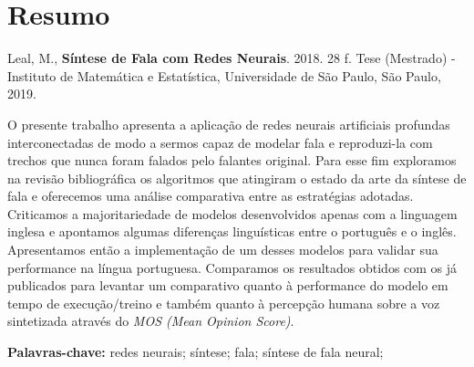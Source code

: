 \documentclass[11pt,twoside,a4paper]{book}
\begin{document}





\chapter*{Resumo}

\noindent Leal, M., \textbf{Síntese de Fala com Redes Neurais}. 2018. 28 f.
Tese (Mestrado) - Instituto de Matemática e Estatística,
Universidade de São Paulo, São Paulo, 2019.

\hfill

O presente trabalho apresenta a aplicação de redes neurais artificiais profundas interconectadas de modo a sermos capaz de modelar fala e reproduzi-la com trechos que nunca foram falados pelo falantes original. Para esse fim exploramos na revisão bibliográfica os algoritmos que atingiram o estado da arte da síntese de fala e oferecemos uma análise comparativa entre as estratégias adotadas. Criticamos a majoritariedade de modelos desenvolvidos apenas com a linguagem inglesa e apontamos algumas diferenças linguísticas entre o português e o inglês. Apresentamos então a implementação de um desses modelos para validar sua performance na língua portuguesa. Comparamos os resultados obtidos com os já publicados para levantar um comparativo quanto à performance do modelo em tempo de execução/treino e também quanto à percepção humana sobre a voz sintetizada através do \textit{MOS (Mean Opinion Score)}.

\hfill

\noindent \textbf{Palavras-chave:} redes neurais; síntese; fala; síntese de fala neural;

\end{document}
